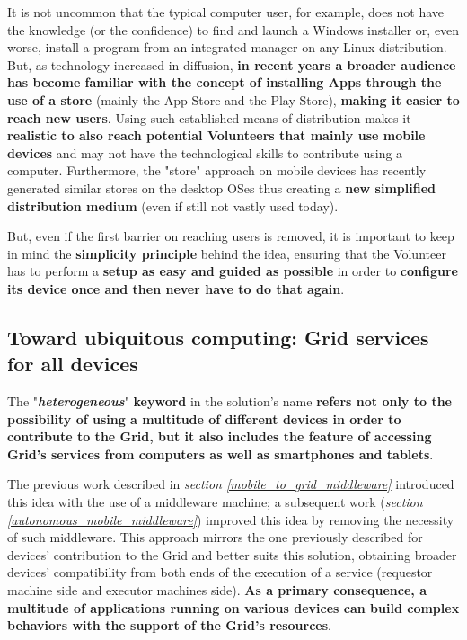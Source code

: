 It is not uncommon that the typical computer user, for example, does not have the knowledge (or the confidence) to find and launch a Windows installer or, even worse, install a program from an integrated manager on any Linux distribution. But, as technology increased in diffusion, \textbf{in recent years a broader audience has become familiar with the concept of installing Apps through the use of a store} (mainly the App Store and the Play Store), \textbf{making it easier to reach new users}. Using such established means of distribution makes it \textbf{realistic to also reach potential Volunteers that mainly use mobile devices} and may not have the technological skills to contribute using a computer. Furthermore, the "store" approach on mobile devices has recently generated similar stores on the desktop OSes thus creating a \textbf{new simplified distribution medium} (even if still not vastly used today).

But, even if the first barrier on reaching users is removed, it is important to keep in mind the \textbf{simplicity principle} behind the idea, ensuring that the Volunteer has to perform a \textbf{setup as easy and guided as possible} in order to \textbf{configure its device once and then never have to do that again}.

\subsection{Toward ubiquitous computing: Grid services for all devices}\label{grid_services_for_all_devices}
The "\textbf{\textit{heterogeneous}}" \textbf{keyword} in the solution's name \textbf{refers not only to the possibility of using a multitude of different devices in order to contribute to the Grid, but it also includes the feature of accessing Grid's services from computers as well as smartphones and tablets}.

The previous work described in \textit{section \ref{mobile_to_grid_middleware}} introduced this idea with the use of a middleware machine; a subsequent work (\textit{section \ref{autonomous_mobile_middleware}}) improved this idea by removing the necessity of such middleware. This approach mirrors the one previously described for devices' contribution to the Grid and better suits this solution, obtaining broader devices' compatibility from both ends of the execution of a service (requestor machine side and executor machines side). \textbf{As a primary consequence, a multitude of applications running on various devices can build complex behaviors with the support of the Grid's resources}.

